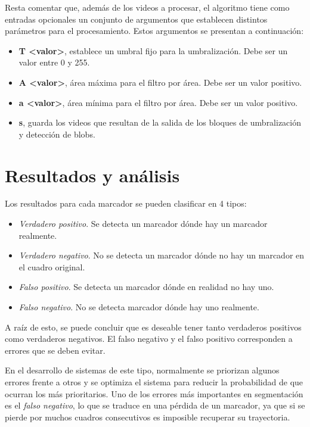  Resta comentar que, además de los videos a procesar, el algoritmo tiene como entradas opcionales un conjunto de argumentos que establecen distintos parámetros para el procesamiento. Estos argumentos se presentan a continuación:

 \begin{itemize}
\item \textbf{T <valor>}, establece un umbral fijo para la umbralización. Debe ser un valor entre 0 y 255.
\item \textbf{A <valor>}, área máxima para el filtro por área. Debe ser un valor positivo.
\item \textbf{a <valor>}, área mínima para el filtro por área. Debe ser un valor positivo.
\item \textbf{s}, guarda los videos que resultan de la salida de los bloques de umbralización y detección de blobs.
 \end{itemize}

\section{Resultados y análisis}
\label{resultadosyanalisissegmentacion}
Los resultados para cada marcador se pueden clasificar en 4 tipos:
\begin{itemize}
\item \textit{Verdadero positivo}. Se detecta un marcador dónde hay un marcador realmente.
\item \textit{Verdadero negativo}. No se detecta un marcador dónde no hay un marcador en el cuadro original.
\item \textit{Falso positivo}. Se detecta un marcador dónde en realidad no hay uno.
\item \textit{Falso negativo}. No se detecta marcador dónde hay uno realmente.
\end{itemize}


A raíz de esto, se puede concluir que es deseable tener tanto verdaderos positivos como verdaderos negativos. El falso negativo y el falso positivo corresponden a errores que se deben evitar. 

En el desarrollo de sistemas de este tipo, normalmente se priorizan algunos errores frente a otros y se optimiza el sistema para reducir la probabilidad de que ocurran los más prioritarios. Uno de los errores más importantes en segmentación es el \textit{falso negativo}, lo que se traduce en una pérdida de un marcador, ya que si se pierde por muchos cuadros consecutivos es imposible recuperar su trayectoria. 

